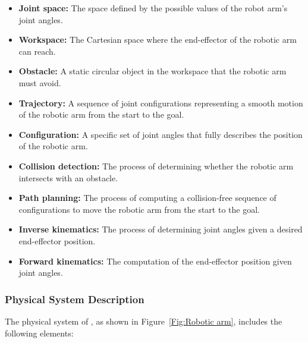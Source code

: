 \documentclass[12pt]{article}
\begin{document}
\begin{itemize}

  \item \textbf{Joint space:} The space defined by the possible values of the robot arm’s joint angles.
  
  \item \textbf{Workspace:} The Cartesian space where the end-effector of the robotic arm can reach.
  
  \item \textbf{Obstacle:} A static circular object in the workspace that the robotic arm must avoid.
  
  \item \textbf{Trajectory:} A sequence of joint configurations representing a smooth motion of the robotic arm from the start to the goal.
  
  \item \textbf{Configuration:} A specific set of joint angles that fully describes the position of the robotic arm.
  
  \item \textbf{Collision detection:} The process of determining whether the robotic arm intersects with an obstacle.
  
  \item \textbf{Path planning:} The process of computing a collision-free sequence of configurations to move the robotic arm from the start to the goal.
  
  \item \textbf{Inverse kinematics:} The process of determining joint angles given a desired end-effector position.
  
  \item \textbf{Forward kinematics:} The computation of the end-effector position given joint angles.
  
  \end{itemize}

\subsubsection{Physical System Description} \label{sec_phySystDescrip}


The physical system of \progname{}, as shown in Figure~\ref{Fig:Robotic arm},
includes the following elements:
\end{document}

